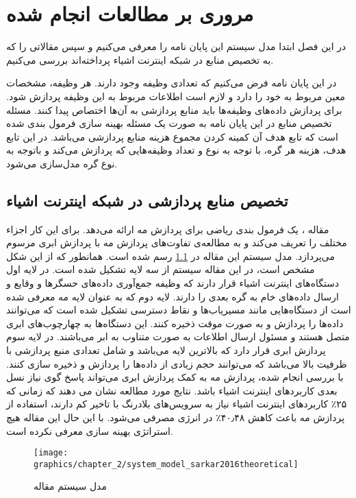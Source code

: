 \chapter{مروری بر مطالعات انجام شده}\label{chap:literature_review}
  \thispagestyle{empty}
  در این فصل ابتدا مدل سیستم این پایان نامه را معرفی می‌کنیم و سپس مقالاتی را که به تخصیص منابع در شبکه اینترنت اشیاء پرداخته‌اند بررسی می‌کنیم.

  در این پایان نامه فرض می‌کنیم که تعدادی وظیفه وجود دارند.
  هر وظیفه، مشخصات معین مربوط به خود را دارد و لازم است اطلاعات مربوط به این وظیفه پردازش شود. 
  برای پردازش داده‌های وظیفه‌ها باید منابع پردازشی به آن‌ها اختصاص پیدا کنند.
  مسئله تخصیص منابع در این پایان نامه به صورت یک مسئله بهینه سازی فرمول بندی شده است که تابع هدف آن کمینه کردن مجموع هزینه منابع پردازشی می‌باشد. 
  در این تابع هدف، هزینه هر گره، با توجه به نوع و تعداد وظیفه‌هایی که پردازش می‌کند و باتوجه به نوع گره مدل‌سازی می‌شود. 

  \section{تخصیص منابع پردازشی در شبکه اینترنت اشیاء}
    مقاله \cite{sarkar2016theoretical}، یک فرمول بندی ریاضی برای پردازش مه ارائه می‌دهد.
    برای این کار اجزاء مختلف را تعریف می‌کند و به مطالعه‌ی تفاوت‌های پردازش مه با پردازش ابری مرسوم می‌پردازد.
    مدل سیستم این مقاله در \cref{fig:chapter_2:system_model_sarkar2016theoretical} رسم شده است.
    همانطور که از این شکل مشخص است، در این مقاله سیستم از سه لایه تشکیل شده است.
    در لایه اول دستگاه‌های اینترنت اشیاء قرار دارند که وظیفه جمع‌آوری داده‌های حسگر‌ها و وقایع و ارسال داده‌های خام به گره بعدی را دارند.
    لایه دوم که به عنوان لایه مه معرفی شده است از دستگاه‌هایی مانند مسیریاب‌ها و نقاط دسترسی تشکیل شده است که می‌توانند داده‌ها را پردازش و به صورت موقت ذخیره کنند.
    این دستگاه‌ها به چهارچوب‌های ابری متصل هستند و مسئول ارسال اطلاعات به صورت متناوب به ابر می‌باشند.
    در لایه سوم پردازش ابری قرار دارد که بالاترین لایه می‌باشد و شامل تعدادی منبع پردازشی با ظرفیت بالا می‌باشد که می‌توانند حجم زیادی از داده‌‌ها را پردازش و ذخیره سازی کنند.
    با بررسی انجام شده، پردازش مه به کمک پردازش ابری می‌تواند پاسخ گوی نیاز نسل بعدی کاربرد‌های اینترنت اشیاء باشد.
    نتایج مورد مطالعه نشان می دهند که زمانی که ۲۵٪ کاربرد‌های اینترنت اشیاء نیاز به سرویس‌های بلادرنگ با تاخیر کم دارند، استفاده از پردازش مه باعث کاهش ۴۰٫۴۸٪ در انرژی مصرفی می‌شود.
    با این حال این مقاله هیچ استراتژی بهینه سازی معرفی نکرده است.

    \begin{figure}[h]
      \centerline{\texttt{[image: graphics/chapter\_2/system\_model\_sarkar2016theoretical]}}
      \caption{مدل سیستم مقاله \cite{sarkar2016theoretical}}
      \label{fig:chapter_2:system_model_sarkar2016theoretical}
    \end{figure}

